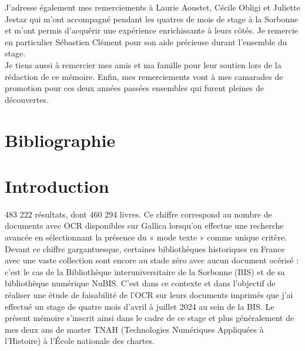 \documentclass[a4paper,12pt,twoside]{book}
\begin{document}
J’adresse également mes remerciements à Laurie Aoustet, Cécile Obligi et Juliette Jestaz qui m’ont accompagné pendant les quatres de mois de stage à la Sorbonne et m’ont permis d’acquérir une expérience enrichissante à leurs côtés. Je remercie en particulier \mbox{Sébastien} Clément pour son aide précieuse durant l’ensemble du stage. \\

Je tiens aussi à remercier mes amis et ma famille pour leur soutien lors de la rédaction de ce mémoire. Enfin, mes remerciements vont à mes camarades de promotion pour ces deux années passées ensembles qui furent pleines de découvertes.\\
	\newpage{\pagestyle{empty}\cleardoublepage}
	
\chapter{Bibliographie}
\printbibliography[keyword=misc, heading=Référentiels]
\printbibliography[keyword=book, heading=Livres]
\printbibliography[keyword=article, heading=Articles]
\printbibliography[keyword=blog, heading=Billets de blog]
\printbibliography[keyword=online, heading=Ressources en ligne]

	
\chapter{Introduction}	
483 222 résultats, dont 460 294 livres. Ce chiffre correspond au nombre
de documents avec OCR disponibles sur Gallica lorsqu'on effectue une
recherche avancée en sélectionnant la présence du « mode texte » comme
unique critère. Devant ce chiffre gargantuesque, certaines bibliothèques
historiques en France avec une vaste collection sont encore au stade
zéro avec aucun document océrisé : c'est le cas de la Bibliothèque
interuniversitaire de la Sorbonne (BIS) et de sa bibliothèque numérique
NuBIS. C'est dans ce contexte et dans l'objectif de réaliser une étude
de faisabilité de l'OCR sur leurs documents imprimés que j'ai effectué
un stage de quatre mois d'avril à juillet 2024 au sein de la BIS. Le
présent mémoire s'inscrit ainsi dans le cadre de ce stage et plus
généralement de mes deux ans de master TNAH (Technologies Numériques
Appliquées à l'Histoire) à l'École nationale des
chartes. \\
\end{document}
